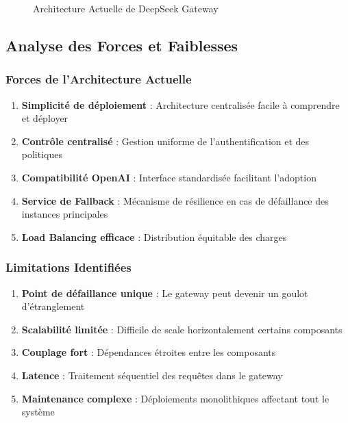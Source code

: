 \documentclass[12pt,a4paper]{article}
\begin{document}
\begin{figure}[H]
\caption{Architecture Actuelle de DeepSeek Gateway}
\label{fig:current_arch}
\end{figure}

\subsection{Analyse des Forces et Faiblesses}

\subsubsection{Forces de l'Architecture Actuelle}

\begin{enumerate}
    \item \textbf{Simplicité de déploiement} : Architecture centralisée facile à comprendre et déployer
    \item \textbf{Contrôle centralisé} : Gestion uniforme de l'authentification et des politiques
    \item \textbf{Compatibilité OpenAI} : Interface standardisée facilitant l'adoption
    \item \textbf{Service de Fallback} : Mécanisme de résilience en cas de défaillance des instances principales
    \item \textbf{Load Balancing efficace} : Distribution équitable des charges
\end{enumerate}

\subsubsection{Limitations Identifiées}

\begin{enumerate}
    \item \textbf{Point de défaillance unique} : Le gateway peut devenir un goulot d'étranglement
    \item \textbf{Scalabilité limitée} : Difficile de scale horizontalement certains composants
    \item \textbf{Couplage fort} : Dépendances étroites entre les composants
    \item \textbf{Latence} : Traitement séquentiel des requêtes dans le gateway
    \item \textbf{Maintenance complexe} : Déploiements monolithiques affectant tout le système
\end{enumerate}
\end{document}
